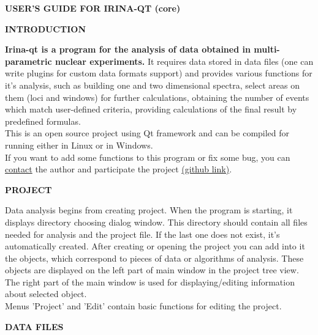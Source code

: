 \documentclass[a4paper]{article}
\begin{document}
\begin{center}{\textbf{\Large USER'S GUIDE FOR IRINA-QT (core)}}\end{center}
%
\hypertarget{intro}{}
{\begin{center}\textbf{INTRODUCTION}\end{center}}
{
\textbf{Irina-qt is a program for the analysis of data obtained in multi-parametric nuclear experiments.} 
It requires data stored in data files (one can write plugins for custom data formats support) and provides various functions for it's analysis, such as building one and two dimensional spectra, select areas on them (loci and windows) for further calculations, obtaining the number of events which match user-defined criteria, providing calculations of the final result by predefined formulas.
\hypertarget{contacts}{\\}
This is an open source project using Qt framework and can be compiled for running either in Linux or in Windows.
\hypertarget{contacts}{\\}
If you want to add some functions to this program or fix some bug, you can 
\href{mailto:alex_kernphysiker@privatdemail.net}{contact} 
the author and participate the project
\href{https://github.com/alexrndl/Irina-qt}{(github link)}.
}
%
\hypertarget{project}{\\}
\begin{center}\textbf{PROJECT}\end{center}
{
Data analysis begins from creating project. When the program is starting, it displays directory choosing dialog window. 
This directory should contain all files needed for analysis and the project file. 
If the last one does not exist, it's automatically created. After creating or opening the project you can add into it the objects, which correspond to pieces of data or algorithms of analysis. 
These objects are displayed on the left part of main window in the project tree view. 
The right part of the main window is used for displaying/editing information about selected object.\\
Menus 'Project' and 'Edit' contain basic functions for editing the project.
}
%
\hypertarget{datafile}{\\}
\begin{center}\textbf{DATA FILES}\end{center}
\end{document}
